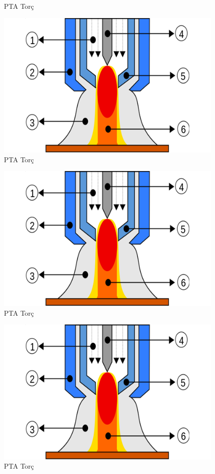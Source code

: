 \begin{figure}[htp]
\caption{PTA Torç}\label{fig:PtaTorc1}
\end{figure}
\begin{figure}[htp]
\includegraphics[width=\textwidth]{gorseller/ptaTorc}
\caption{PTA Torç}\label{fig:PtaTorc2}
\end{figure}
\begin{figure}[htp]
\includegraphics[width=\textwidth]{gorseller/ptaTorc}\centering
\centering
\centering
\centering

\caption{PTA Torç}\label{fig:PtaTorc3}
\end{figure}
\begin{figure}[htp]
\includegraphics[width=\textwidth]{gorseller/ptaTorc}
\caption{PTA Torç}\label{fig:PtaTorc4}
\end{figure}
